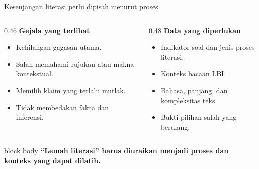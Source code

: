 \begin{frame}{Kesenjangan literasi perlu dipisah menurut proses}
  \begin{columns}[T,onlytextwidth]
    \begin{column}{0.46\textwidth}
      {\color{StudentBlue}\bfseries Gejala yang terlihat}\par
      \begin{itemize}
        \item Kehilangan gagasan utama.
        \item Salah memahami rujukan atau makna kontekstual.
        \item Memilih klaim yang terlalu mutlak.
        \item Tidak membedakan fakta dan inferensi.
      \end{itemize}
    \end{column}
    \begin{column}{0.48\textwidth}
      {\color{StudentBlue}\bfseries Data yang diperlukan}\par
      \begin{itemize}
        \item Indikator soal dan jenis proses literasi.
        \item Konteks bacaan LBI.
        \item Bahasa, panjang, dan kompleksitas teks.
        \item Bukti pilihan salah yang berulang.
      \end{itemize}
    \end{column}
  \end{columns}
  \vspace{0.14cm}
  \begin{beamercolorbox}[rounded=true,sep=0.17cm,wd=\textwidth]{block body}
    \centering\bfseries ``Lemah literasi'' harus diuraikan menjadi proses dan konteks yang dapat dilatih.
  \end{beamercolorbox}
\end{frame}

